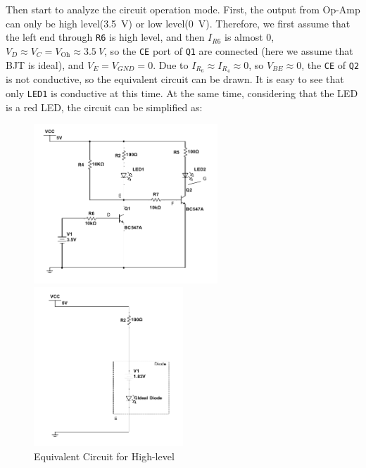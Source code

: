 \documentclass[12pt]{article}
\numberwithin{equation}{section}
\begin{document}
Then start to analyze the circuit operation mode. First, the output from Op-Amp can only be high level(\qty{3.5}{V}) or low level(\qty{0}{V}). Therefore, we first assume that the left end through \verb|R6| is high level, and then $I_{R6}$ is almost \num{0}, $V_{D} \approx V_ {C}= V_{\text{Oh}} \approx \qty{3.5}{V}$, so the \verb|CE| port of \verb|Q1| are connected (here we assume that BJT is ideal), and $V_E=V_{GND}=0 $. Due to $I_{R_6} \approx I_{R_4} \approx 0 $, so $V_{BE} \approx 0$, the \verb|CE| of \verb|Q2| is not conductive, so the equivalent circuit can be drawn. It is easy to see that only \verb|LED1| is conductive at this time. At the same time, considering that the LED is a red LED, the circuit can be simplified as:



\begin{figure}[H]
\centering
\begin{minipage}[t]{0.48\textwidth}
\centering
\includegraphics[height=6cm]{LED_module_hi_1.pdf}

\caption{$V_D=3.5V$}
\end{minipage}
\begin{minipage}[t]{0.48\textwidth}
\centering
\includegraphics[height=6cm]{LED_control_module_hi_2}

\caption{Equivalent Circuit for High-level}
\end{minipage}
\end{figure}
\end{document}
